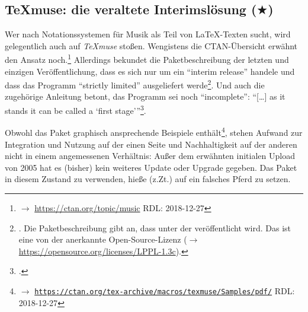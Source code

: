 %
%
%



\subsection{{\TeX}muse: die veraltete Interimslösung ($\bigstar$)}

Wer nach Notationssystemen für Musik als Teil von \LaTeX-Texten sucht, wird
gelegentlich auch auf \textit{{\TeX}muse} stoßen. Wengistens die CTAN-Übersicht
erwähnt den Ansatz noch.\footnote{$\rightarrow$
\href{https://ctan.org/topic/music} {https://ctan.org/topic/music} RDL:
2018-12-27} Allerdings bekundet die Paketbeschreibung der letzten und einzigen
Veröffentlichung, dass es sich nur um ein \enquote{in­terim re­lease} handele
und dass das Programm \enquote{strictly lim­ited} ausgeliefert
werde\footnote{\cite[vgl.][\nopage wp]{CtanTexmuse2005a}. Die Paket\-beschreibung
gibt an, dass  unter der 
veröffentlicht wird. Das ist eine von der  anerkannte
Open-Source-Lizenz ($\rightarrow$
\href{https://opensource.org/licenses/LPPL-1.3c}
{https://opensource.org/licenses/LPPL-1.3c}).}. Und auch die zugehörige
Anleitung betont, das Programm sei noch \enquote{incomplete}: \enquote{[\ldots]
as it stands it can be called a ‘first stage'}\footcite[vgl.][1]{Garcia2005a}.

Obwohl das Paket graphisch ansprechende Beispiele enthält\footnote{$\rightarrow$
\href{https://ctan.org/tex-archive/macros/texmuse/Samples/pdf/}
{\texttt{https://ctan.org/tex-archive/macros/texmuse/Samples/pdf/}} RDL:
2018-12-27}, stehen Aufwand zur Integration und Nutzung auf der einen Seite und
Nachhaltigkeit auf der anderen nicht in einem angemessenen Verhältnis: Außer dem
erwähnten initialen Upload von 2005 hat es (bisher) kein weiteres Update oder
Upgrade gegeben. Das Paket in diesem Zustand zu verwenden, hieße (z.Zt.) auf ein
falsches Pferd zu setzen.


%
